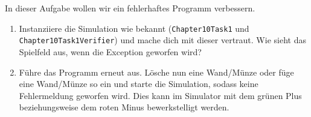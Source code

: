 

In dieser Aufgabe wollen wir ein fehlerhaftes Programm verbessern. 

\begin{enumerate}                           
    \item Instanziiere die Simulation wie bekannt (\lstinline{Chapter10Task1} und \lstinline{Chapter10Task1Verifier}) und mache dich mit dieser vertraut.
        Wie sieht das Spielfeld aus, wenn die Exception geworfen wird?
    \item Führe das Programm erneut aus. Lösche nun eine Wand/Münze oder füge eine Wand/Münze so ein und starte die Simulation, sodass keine Fehlermeldung geworfen wird. Dies kann im Simulator mit dem grünen Plus beziehungsweise dem roten Minus bewerkstelligt werden.
\end{enumerate}
